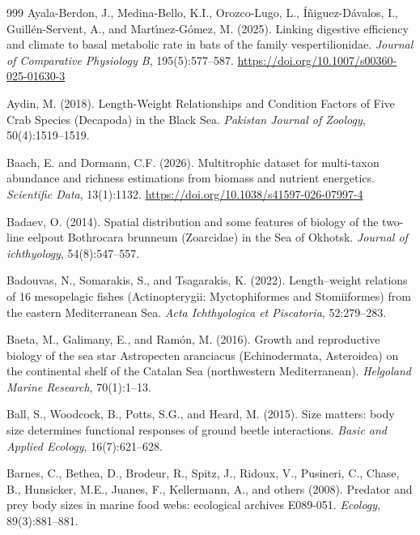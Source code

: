 \begin{thebibliography}{999}
Ayala-Berdon, J., Medina-Bello, K.I., Orozco-Lugo, L., {\'I}{\~n}iguez-D{\'a}valos, I., Guill{\'e}n-Servent, A., and Mart{\'\i}nez-G{\'o}mez, M. (2025). Linking digestive efficiency and climate to basal metabolic rate in bats of the family vespertilionidae. \textit{Journal of Comparative Physiology B}, 195(5):577--587. \url{https://doi.org/10.1007/s00360-025-01630-3}

Aydin, M. (2018). Length-Weight Relationships and Condition Factors of Five Crab Species (Decapoda) in the Black Sea. \textit{Pakistan Journal of Zoology}, 50(4):1519--1519.

Baach, E. and Dormann, C.F. (2026). Multitrophic dataset for multi-taxon abundance and richness estimations from biomass and nutrient energetics. \textit{Scientific Data}, 13(1):1132. \url{https://doi.org/10.1038/s41597-026-07997-4}

Badaev, O. (2014). Spatial distribution and some features of biology of the two-line eelpout Bothrocara brunneum (Zoarcidae) in the Sea of Okhotsk. \textit{Journal of ichthyology}, 54(8):547--557.

Badouvas, N., Somarakis, S., and Tsagarakis, K. (2022). Length--weight relations of 16 mesopelagic fishes (Actinopterygii: Myctophiformes and Stomiiformes) from the eastern Mediterranean Sea. \textit{Acta Ichthyologica et Piscatoria}, 52:279--283.

Baeta, M., Galimany, E., and Ram{\'o}n, M. (2016). Growth and reproductive biology of the sea star Astropecten aranciacus (Echinodermata, Asteroidea) on the continental shelf of the Catalan Sea (northwestern Mediterranean). \textit{Helgoland Marine Research}, 70(1):1--13.

Ball, S., Woodcock, B., Potts, S.G., and Heard, M. (2015). Size matters: body size determines functional responses of ground beetle interactions. \textit{Basic and Applied Ecology}, 16(7):621--628.

Barnes, C., Bethea, D., Brodeur, R., Spitz, J., Ridoux, V., Pusineri, C., Chase, B., Hunsicker, M.E., Juanes, F., Kellermann, A., and others (2008). Predator and prey body sizes in marine food webs: ecological archives E089-051. \textit{Ecology}, 89(3):881--881.


\end{thebibliography}

